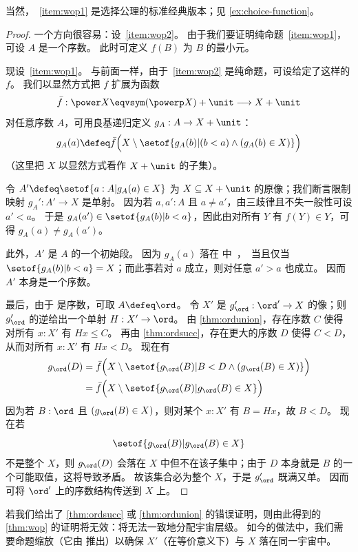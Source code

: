 \noindent
当然，~\ref{item:wop1} 是选择公理的标准经典版本；见 \cref{ex:choice-function}。

\begin{proof}
  一个方向很容易：设~\ref{item:wop2}。
  由于我们要证明纯命题~\ref{item:wop1}，可设 $A$ 是一个序数。
  此时可定义 $f(B)$ 为 $B$ 的最小元。

  现设~\ref{item:wop1}。
  与前面一样，由于~\ref{item:wop2} 是纯命题，可设给定了这样的 $f$。
  我们以显然方式把 $f$ 扩展为函数
  \[ \bar f:\power X \eqvsym (\powerp X) + \unit \longrightarrow X+\unit
  \]
  对任意序数 $A$，可用良基递归定义 $g_A:A\to X+\unit$：
  \[ g_A(a) \defeq
    \bar f\Big(X \setminus \setof{ g_A(b) | \strut (b<a) \wedge (g_A(b) \in X) }\Big)
  \]
  （这里把 $X$ 以显然方式看作 $X+\unit$ 的子集）。

  令 $A'\defeq \setof{a:A | g_A(a) \in X}$ 为 $X\subseteq X+\unit$ 的原像；我们断言限制映射 $g_A':A' \to X$ 是单射。
  因为若 $a,a':A$ 且 $a\neq a'$，由三歧律且不失一般性可设 $a'<a$。
  于是 $g_A(a') \in \setof{ g_A(b) | b<a }$，因此由对所有 $Y$ 有 $f(Y)\in Y$，可得 $g_A(a) \neq g_A(a')$。

  此外，$A'$ 是 $A$ 的一个初始段。
  因为 $g_A(a)$ 落在 \unit 中，当且仅当 $\setof{g_A(b)|b<a} = X$；而此事若对 $a$ 成立，则对任意 $a'>a$ 也成立。
  因而 $A'$ 本身是一个序数。

  最后，由于 \ord 是序数，可取 $A\defeq\ord$。
  令 $X'$ 是 $g_\ord':\ord' \to X$ 的像；则 $g_\ord'$ 的逆给出一个单射 $H:X'\to \ord$。
  由 \cref{thm:ordunion}，存在序数 $C$ 使得对所有 $x:X'$ 有 $Hx\le C$。
  再由 \cref{thm:ordsucc}，存在更大的序数 $D$ 使得 $C<D$，从而对所有 $x:X'$ 有 $Hx<D$。
  现在有
  \begin{align*}
    g_{\ord}(D) &= \bar f\Big( X \setminus \setof{ g_\ord(B) | \rule{0pt}{1em} B<D \wedge (g_\ord(B) \in X)} \Big)\\
    &=\bar f\Big( X \setminus \setof{ g_\ord(B) | \rule{0pt}{1em} g_\ord(B) \in X} \Big)
  \end{align*}
  因为若 $B:\ord$ 且 $(g_\ord(B) \in X)$，则对某个 $x:X'$ 有 $B = Hx$，故 $B<D$。
  现在若
  \[\setof{ g_\ord(B) | \rule{0pt}{1em} g_\ord(B) \in X}\]
  不是整个 $X$，则 $g_\ord(D)$ 会落在 $X$ 中但不在该子集中；由于 $D$ 本身就是 $B$ 的一个可能取值，这将导致矛盾。
  故该集合必为整个 $X$，于是 $g_\ord'$ 既满又单。
  因而可将 $\ord'$ 上的序数结构传送到 $X$ 上。
\end{proof}

\begin{rmk}
  若我们给出了 \cref{thm:ordsucc} 或 \cref{thm:ordunion} 的错误证明，则由此得到的 \cref{thm:wop} 的证明将无效：将无法一致地分配宇宙层级。
  如今的做法中，我们需要命题缩放（它由 \LEM{} 推出）以确保 $X'$（在等价意义下）与 $X$ 落在同一宇宙中。
\end{rmk}

